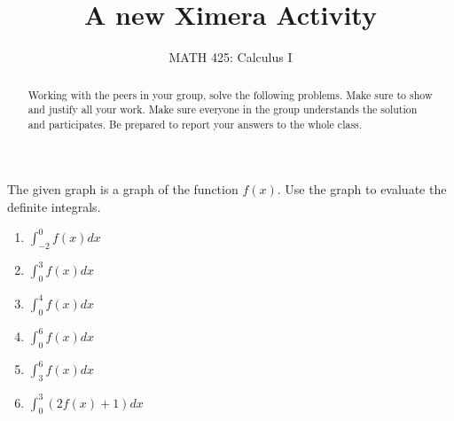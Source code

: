 \documentclass{ximera}
\title{A new Ximera Activity}
\author{MATH 425: Calculus I}
\begin{document}
\begin{abstract}
   Working with the peers in your group, solve the following problems. Make sure to show and justify all your work. Make sure everyone in the group understands the solution and participates. Be prepared to report your answers to the whole class. 
\end{abstract}
\maketitle


\begin{exercise}
    The given graph is a graph of the function $f(x)$. Use the graph to evaluate the definite integrals.
    \begin{image}
    \end{image}
       \begin{enumerate}
        \item $\displaystyle \int_{-2}^{0} f(x)dx$%
        \item $ \displaystyle\int_{0}^3 f(x) dx$ %
        \item $\displaystyle\int_0^4f(x) dx$ %
        \item $\displaystyle\int_0^6 f(x) dx$ %
        \item $\displaystyle\int_3^6 f(x)dx$ %
        \item $\displaystyle\int_0^3 (2f(x)+1)dx$ %
    \end{enumerate} 
\end{exercise} 
    
\end{document}
